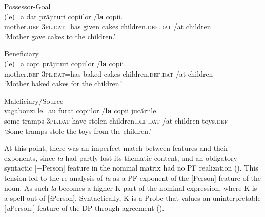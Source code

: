 \documentclass[output=paper,colorlinks,citecolor=brown,nonflat]{langsci/langscibook}
\begin{document}
\ea %
      \label{ex:cornilescu:12}
      Possessor-Goal\\
       {(le)=a} {dat} {prăjituri} copiilor /\textbf{la} {copii.} \\
           mother.\textsc{def} \textsc{3pl.dat}=has given cakes children.\textsc{def}.\textsc{dat} /at children\\
      \glt ‘Mother gave cakes to the children.’
      \z



\ea%
      \label{ex:cornilescu:13}
      Beneficiary \\
       {(le)=a} {copt} prăjituri copiilor /\textbf{la} {copii}.\\
             mother.\textsc{def} \textsc{3pl.dat}=has baked cakes children.\textsc{def}.\textsc{dat} /at children\\
      \glt ‘Mother baked cakes {for} the children.’
      \z




\ea%
      \label{ex:cornilescu:14}
      Maleficiary/Source \\
       {vagabonzi} {le=au} {furat} copiilor /\textbf{la} {copii} {jucăriile.} \\
             some tramps \textsc{3pl.dat-}have stolen children.\textsc{def}.\textsc{dat} /at children toys.\textsc{def}\\
      \glt ‘Some tramps stole the toys from the children.’
      \z

At this point, there was an imperfect match between features and their exponents, since \textit{la} had partly lost its thematic content, and an obligatory syntactic [+Person] feature in the nominal matrix had no PF realization (). This tension led to the re-analysis of \textit{la} as a PF exponent of the [Person] feature of the noun. As such \textit{la} becomes a higher K part of the nominal expression, where K is a spell-out of [\textit{i}Person]. Syntactically, K is a Probe that values an uninterpretable [\textit{u}Person:{\longrule}] feature of the DP through agreement ().
\end{document}
